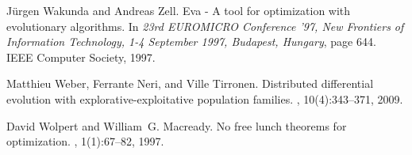 \documentclass[final,1p,times]{elsarticle}
\begin{document}
\begin{thebibliography}{10}
J{\"{u}}rgen Wakunda and Andreas Zell.
\newblock Eva - {A} tool for optimization with evolutionary algorithms.
\newblock In {\em 23rd {EUROMICRO} Conference '97, New Frontiers of Information
  Technology, 1-4 September 1997, Budapest, Hungary}, page 644. {IEEE} Computer
  Society, 1997.

Matthieu Weber, Ferrante Neri, and Ville Tirronen.
\newblock Distributed differential evolution with explorative-exploitative
  population families.
, 10(4):343--371,
  2009.

David Wolpert and William~G. Macready.
\newblock No free lunch theorems for optimization.
, 1(1):67--82, 1997.



\end{thebibliography}
\end{document}

